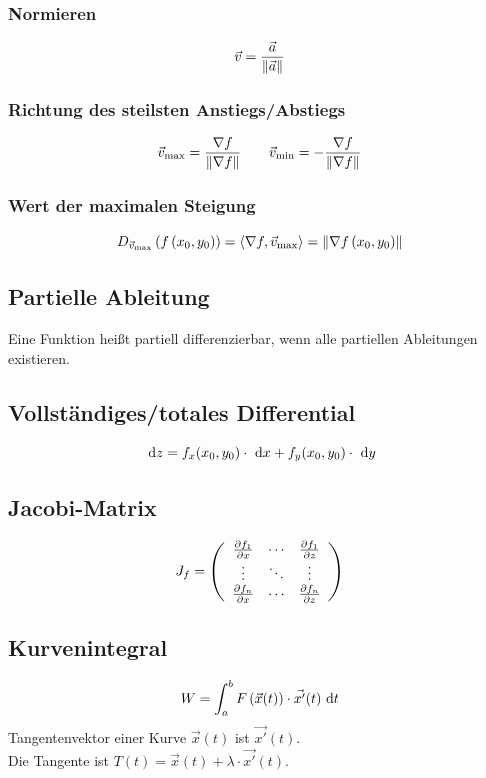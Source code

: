 \documentclass[main.tex]{subfiles}
\begin{document}
\subsubsection{Normieren}
\[
    \vec{v} = \frac{\vec{a}}{\norm*{\vec{a}}}
\]
\subsubsection{Richtung des steilsten Anstiegs/Abstiegs}
\[
    \vec{v}_{\text{max}} = \frac{\nabla f}{\norm*{\nabla f}}
    \qquad
    \vec{v}_{\text{min}} = - \frac{\nabla f}{\norm*{\nabla f}}
\]
\subsubsection{Wert der maximalen Steigung}
\[
    D_{\vec{v}_{\text{max}}}\left(f\left(x_0, y_0\right)\right)
    = \scalarprod*{\nabla f, \vec{v}_{\text{max}}}
    = \norm*{\nabla f\left(x_0, y_0\right)}
\]

\subsection{Partielle Ableitung}
Eine Funktion heißt partiell differenzierbar, wenn alle partiellen Ableitungen existieren.

\subsection{Vollständiges/totales Differential}
\[
    \dx{z} = f_x (x_0, y_0)\cdot \dx{x} + f_y(x_0, y_0)\cdot \dx{y}
\]

\subsection{Jacobi-Matrix}
\[
    J_f = \eqmatrix{ccc}{
        \frac{\partial f_1}{\partial x} & \cdots & \frac{\partial f_1}{\partial z} \\
        \vdots & \ddots & \vdots \\
        \frac{\partial f_n}{\partial x} & \cdots & \frac{\partial f_n}{\partial z} \\
    }
\]



\subsection{Kurvenintegral}
\[
    W = \int_{a}^{b} F\left( \vec{x}(t) \right) \cdot \vec{x'}(t) \dx{t}
\]
Tangentenvektor einer Kurve $\vec{x}(t)$ ist $\vec{x'}(t)$.\\
Die Tangente ist $T(t) = \vec{x}(t) + \lambda\cdot \vec{x'}(t)$.
\end{document}
